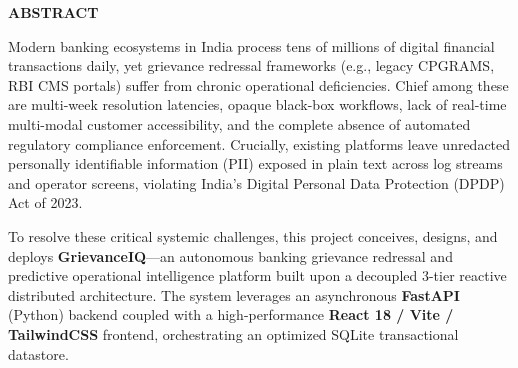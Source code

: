 \newpage
\thispagestyle{plain}
\begin{center}
\Large\textbf{ABSTRACT}
\end{center}
\vspace{0.8cm}

\noindent Modern banking ecosystems in India process tens of millions of digital financial transactions daily, yet grievance redressal frameworks (e.g., legacy CPGRAMS, RBI CMS portals) suffer from chronic operational deficiencies. Chief among these are multi-week resolution latencies, opaque black-box workflows, lack of real-time multi-modal customer accessibility, and the complete absence of automated regulatory compliance enforcement. Crucially, existing platforms leave unredacted personally identifiable information (PII) exposed in plain text across log streams and operator screens, violating India's Digital Personal Data Protection (DPDP) Act of 2023.

\vspace{0.4cm}
\noindent To resolve these critical systemic challenges, this project conceives, designs, and deploys \textbf{GrievanceIQ}—an autonomous banking grievance redressal and predictive operational intelligence platform built upon a decoupled 3-tier reactive distributed architecture. The system leverages an asynchronous \textbf{FastAPI} (Python) backend coupled with a high-performance \textbf{React 18 / Vite / TailwindCSS} frontend, orchestrating an optimized SQLite transactional datastore. 

